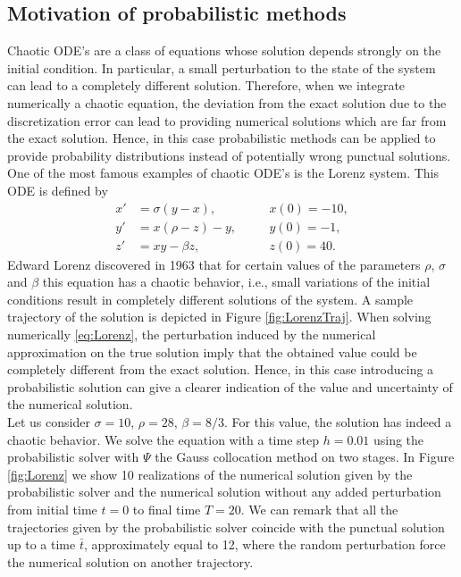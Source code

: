 \subsection{Motivation of probabilistic methods}

Chaotic ODE's are a class of equations whose solution depends strongly on the initial condition. In particular, a small perturbation to the state of the system can lead to a completely different solution. Therefore, when we integrate numerically a chaotic equation, the deviation from the exact solution due to the discretization error can lead to providing numerical solutions which are far from the exact solution. Hence, in this case probabilistic methods can be applied to provide probability distributions instead of potentially wrong punctual solutions.\\
One of the most famous examples of chaotic ODE's is the Lorenz system. This ODE is defined by
\begin{equation}\label{eq:Lorenz}
\begin{aligned}
x' &= \sigma(y - x), \quad &&x(0) = -10,\\
y' &= x(\rho - z) - y, \quad &&y(0) = -1,\\
z' &= xy - \beta z, \quad &&z(0) = 40.
\end{aligned}
\end{equation}
Edward Lorenz discovered in 1963 that for certain values of the parameters $\rho$, $\sigma$ and $\beta$ this equation has a chaotic behavior, i.e., small variations of the initial conditions result in completely different solutions of the system. A sample trajectory of the solution is depicted in Figure \ref{fig:LorenzTraj}. When solving numerically \eqref{eq:Lorenz}, the perturbation induced by the numerical approximation on the true solution imply that the obtained value could be completely different from the exact solution. Hence, in this case introducing a probabilistic solution can give a clearer indication of the value and uncertainty of the numerical solution. \\
Let us consider $\sigma = 10$, $\rho = 28$, $\beta = 8/3$. For this value, the solution has indeed a chaotic behavior. We solve the equation with a time step $h = 0.01$ using the probabilistic solver with $\Psi$ the Gauss collocation method on two stages. In Figure \ref{fig:Lorenz} we show 10 realizations of the numerical solution given by the probabilistic solver and the numerical solution without any added perturbation from initial time $t = 0$ to final time $T = 20$. We can remark that all the trajectories given by the probabilistic solver coincide with the punctual solution up to a time $\bar t$, approximately equal to 12, where the random perturbation force the numerical solution on another trajectory. 

